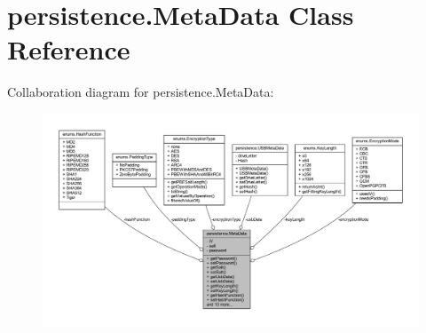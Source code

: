 \hypertarget{classpersistence_1_1_meta_data}{}\section{persistence.\+Meta\+Data Class Reference}
\label{classpersistence_1_1_meta_data}


Collaboration diagram for persistence.\+Meta\+Data\+:\nopagebreak
\begin{figure}[H]
\begin{center}
\leavevmode
\includegraphics[width=350pt]{classpersistence_1_1_meta_data__coll__graph}
\end{center}
\end{figure}

